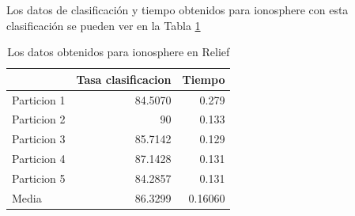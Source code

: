 \documentclass[12pt,a4paper]{article}
\begin{document}
Los datos de clasificación y tiempo obtenidos para ionosphere con esta clasificación se pueden ver en la Tabla \ref{tab:1ionosphere}
\begin{table}[H]
	\centering
	\caption {Los datos obtenidos para ionosphere en Relief} \label{tab:1ionosphere} 
	
	\begin{tabular}{|l|r|r|}
		\hline
		& Tasa clasificacion & Tiempo\\
		\hline
		Particion 1 & 84.5070 & 0.279 \\
		\hline
		Particion 2 & 90 & 0.133 \\
		\hline
		Particion 3 &  85.7142 &  0.129\\
		\hline
		Particion 4 & 87.1428 &  0.131\\
		\hline
		Particion 5 & 84.2857 & 0.131 \\
		\hline
		Media &86.3299 & 0.16060 \\
		\hline
	\end{tabular}
\end{table}
\end{document}
